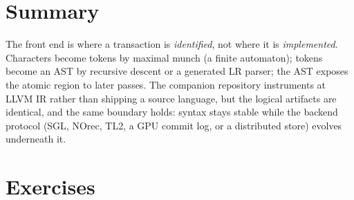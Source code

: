 \section{Summary}

The front end is where a transaction is \emph{identified}, not where it is
\emph{implemented}.  Characters become tokens by maximal munch (a finite
automaton); tokens become an AST by recursive descent or a generated LR
parser; the AST exposes the atomic region to later passes.  The companion
repository instruments at LLVM IR rather than shipping a source language,
but the logical artifacts are identical, and the same boundary holds:
syntax stays stable while the backend protocol (SGL, NOrec, TL2, a GPU
commit log, or a distributed store) evolves underneath it.

\section{Exercises}
\label{sec:ch15-exercises}
